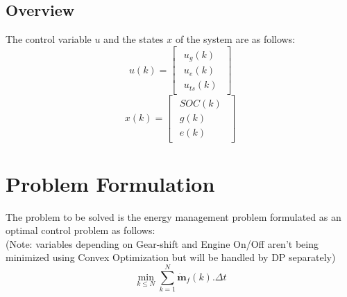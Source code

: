 \documentclass[conference]{IEEEtran}
\begin{document}
 



\subsection{Overview}
The control variable $u$ and the states $x$ of the system are as follows:\\
\begin{equation}
 u(k) = \begin{bmatrix}
\begin{matrix} u_g(k) \\ u_e(k) \\ u_{ts}(k) \end{matrix} 
\end{bmatrix}
\end{equation}
\begin{equation}
 x(k) = \begin{bmatrix}
\begin{matrix} SOC(k) \\ g(k) \\ e(k) \end{matrix} 
\end{bmatrix}
\end{equation}

\section{\textbf{Problem Formulation}}
The problem to be solved is the energy management problem formulated as an optimal control problem as follows: \\
(Note: variables depending on Gear-shift and Engine On/Off aren't being minimized using Convex Optimization but will be handled by DP separately)
\begin{equation}
\min_{k\leq N}  \sum_{k=1}^N \dot{\textbf{m}}_f(k).\Delta t
\end{equation}
\end{document}
